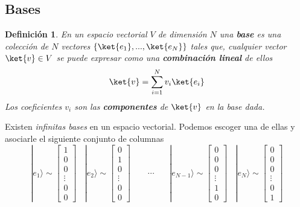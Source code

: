 \documentclass[a4paper,11pt]{book} %
\newtheorem{definicion_contador}{Definición}
\newcommand{\Definicion}[1]{
		\begin{mybox_gray2}{}
			\begin{definicion_contador}
				 #1 
			\end{definicion_contador} 
		\end{mybox_gray2}
	}
\numberwithin{equation}{chapter}
\begin{document}
		
		\subsection{Bases}
		
	\Definicion{
	En un espacio vectorial $V$ de dimensión $N$ una \textbf{base} es una colección de $N$ vectores  $\{\ket{e_1},...,\ket{e_N}\}$ tales que, cualquier vector $\ket{v}\in V$ se puede expresar como una \textbf{combinación lineal} de ellos
$$
\ket{v} = \sum_{i=1}^N v_i \ket{e_i}
$$  
Los coeficientes $v_i$ son las \textbf{componentes} de $\ket{v}$ \textit{en la base dada}.
	}		
	
Existen \textit{infinitas bases} en un espacio vectorial. Podemos escoger una de ellas y asociarle el siguiente conjunto de columnas
	\begin{equation} \label{ec_formalismo_base_cartesina}
|e_1\rangle \sim \begin{bmatrix} 1 \\ 0 \\ 0\\ \vdots 
\\ 0 \\ 0 \end{bmatrix}~~~~
|e_2\rangle \sim \begin{bmatrix} 0 \\ 1 \\ 0\\ \vdots 
\\ 0 \\ 0 \end{bmatrix}~~~~~~~~~
\cdots ~~~~~~~~
|e_{N-1}\rangle \sim \begin{bmatrix} 0 \\ 0 \\ 0\\\vdots 
\\ 1 \\ 0 \end{bmatrix}~~~~
|e_N\rangle \sim \begin{bmatrix} 0 \\ 0 \\0\\ \vdots 
\\ 0 \\ 1 \end{bmatrix}
	\end{equation}
\end{document}
